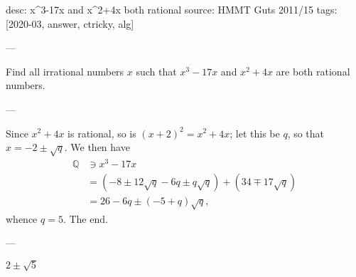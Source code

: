 desc: x^3-17x and x^2+4x both rational
source: HMMT Guts 2011/15
tags: [2020-03, answer, ctricky, alg]

---

Find all irrational numbers $x$ such that $x^3-17x$ and $x^2+4x$ are both rational numbers.

---

Since $x^2+4x$ is rational, so is $(x+2)^2=x^2+4x$; let this be $q$, so that $x=-2\pm\sqrt q$. We then have 
\begin{align*}
    \mathbb Q&\ni x^3-17x\\
    &=\left(-8\pm12\sqrt q-6q\pm q\sqrt q\right)+\left(34\mp17\sqrt q\right)\\
    &=26-6q\pm(-5+q)\sqrt q,
\end{align*}
whence $q=5$. The end.

---

$2\pm\sqrt5$
